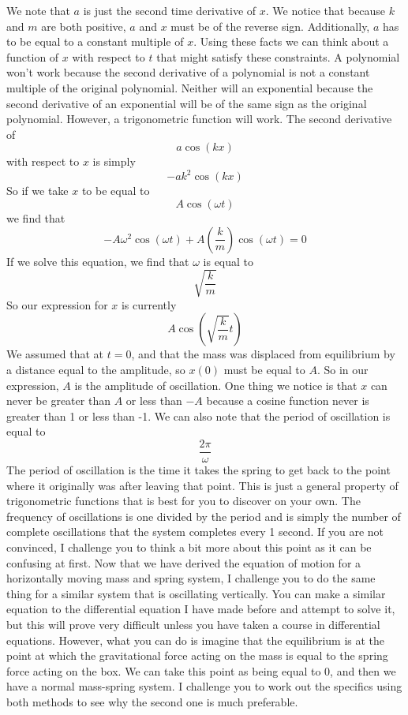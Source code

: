 We note that $a$ is just the second time derivative of $x$. We notice that because $k$ and $m$ are both positive, $a$ and $x$ must be of the reverse sign. Additionally, $a$ has to be equal to a constant multiple of $x$. Using these facts we can think about a function of $x$ with respect to $t$ that might satisfy these constraints. A polynomial won’t work because the second derivative of a polynomial is not a constant multiple of the original polynomial. Neither will an exponential because the second derivative of an exponential will be of the same sign as the original polynomial. However, a trigonometric function will work. The second derivative of $$a\cos\left(kx\right)$$ with respect to $x$ is simply $$-ak^2\cos\left(kx\right)$$ So if we take $x$ to be equal to $$A\cos\left(\omega t \right)$$ we find that $$-A\omega^2\cos\left(\omega t \right)+A\left(\frac{k}{m}\right)\cos\left(\omega t \right)=0$$ If we solve this equation, we find that $\omega$ is equal to $$\sqrt{\frac{k}{m}}$$ So our expression for $x$ is currently $$A\cos\left(\sqrt{\frac{k}{m}}t\right)$$ We assumed that at $t = 0$, and that the mass was displaced from equilibrium by a distance equal to the amplitude, so $x\left(0\right)$ must be equal to $A$. So in our expression, $A$ is the amplitude of oscillation. One thing we notice is that $x$ can never be greater than $A$ or less than $-A$ because a cosine function never is greater than 1 or less than -1. We can also note that the period of oscillation is equal to $$\frac{2\pi}{\omega}$$ The period of oscillation is the time it takes the spring to get back to the point where it originally was after leaving that point. This is just a general property of trigonometric functions that is best for you to discover on your own.  The frequency of oscillations is one divided by the period and is simply the number of complete oscillations that the system completes every 1 second. If you are not convinced, I challenge you to think a bit more about this point as it can be confusing at first. 
Now that we have derived the equation of motion for a horizontally moving mass and spring system, I challenge you to do the same thing for a similar system that is oscillating vertically. You can make a similar equation to the differential equation I have made before and attempt to solve it, but this will prove very difficult unless you have taken a course in differential equations. However, what you can do is imagine that the equilibrium is at the point at which the gravitational force acting on the mass is equal to the spring force acting on the box. We can take this point as being equal to 0, and then we have a normal mass-spring system. I challenge you to work out the specifics using both methods to see why the second one is much preferable.  

